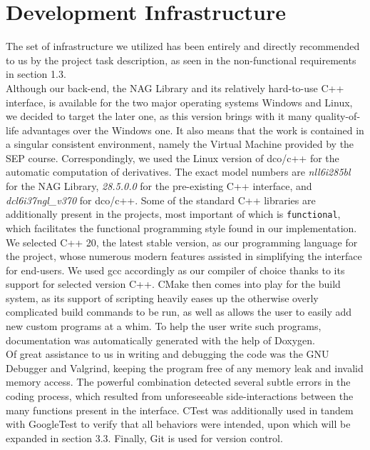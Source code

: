 \documentclass{book}
\begin{document}
\section{Development Infrastructure}
The set of infrastructure we utilized has been entirely and directly recommended to us by the project task description, as seen in the non-functional requirements in section 1.3. \\
\newline
Although our back-end, the NAG Library and its relatively hard-to-use C++ interface, is available for the two major operating systems Windows and Linux, we decided to target the later one, as this version brings with it many quality-of-life advantages over the Windows one. It also means that the work is contained in a singular consistent environment, namely the Virtual Machine provided by the SEP course. Correspondingly, we used the Linux version of dco/c++ for the automatic computation of derivatives. The exact model numbers are \textit{nll6i285bl} for the NAG Library, \textit{28.5.0.0} for the pre-existing C++ interface, and \textit{dcl6i37ngl\_v370} for dco/c++. Some of the standard C++ libraries are additionally present in the projects, most important of which is \texttt{functional}, which facilitates the functional programming style found in our implementation.\\
\newline
We selected C++ 20, the latest stable version, as our programming language for the project, whose numerous modern features assisted in simplifying the interface for end-users. We used gcc accordingly as our compiler of choice thanks to its support for selected version C++. CMake then comes into play for the build system, as its support of scripting heavily eases up the otherwise overly complicated build commands to be run, as well as allows the user to easily add new custom programs at a whim. To help the user write such programs, documentation was automatically generated with the help of Doxygen.\\
\newline
Of great assistance to us in writing and debugging the code was the GNU Debugger and Valgrind, keeping the program free of any memory leak and invalid memory access. The powerful combination detected several subtle errors in the coding process, which resulted from unforeseeable side-interactions between the many functions present in the interface. CTest was additionally used in tandem with GoogleTest to verify that all behaviors were intended, upon which will be expanded in section 3.3. Finally, Git is used for version control.
\end{document}
